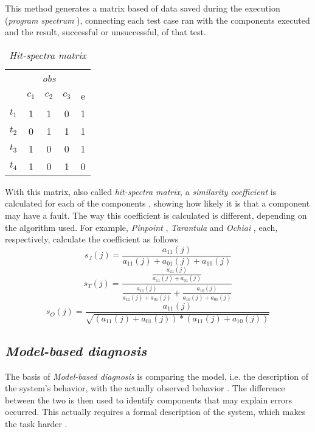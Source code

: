 This method generates a matrix based of data saved during the execution (\emph{program spectrum} \cite{Reps1997}), connecting each test case ran with the components executed and the result, successful or unsuccessful, of that test.

\begin{table}[H]
  \centering
  \begin{tabular}{c|ccc|c} 
    & \multicolumn{3}{c|}{\textit{obs}} &  \\
    & $c_1$ & $c_2$ & $c_3$ & e \\ 
    \hline
    $t_1$ & 1 & 1 & 0 & 1 \\
    $t_2$ & 0 & 1 & 1 & 1 \\
    $t_3$ & 1 & 0 & 0 & 1 \\
    $t_4$ & 1 & 0 & 1 & 0 \\
  \end{tabular}
  \caption{\emph{Hit-spectra matrix}}
  \label{tab:hit-spectra}
\end{table}

With this matrix, also called \emph{hit-spectra matrix}, a \emph{similarity coefficient} is calculated for each of the components \cite{Abreu2009}, showing how likely it is that a component may have a fault. The way this coefficient is calculated is different, depending on the algorithm used. For example, \emph{Pinpoint} \cite{Chen2002}, \emph{Tarantula} \cite{Jones2005} and \emph{Ochiai} \cite{Abreu2007}, each, respectively, calculate the coefficient as follows
%
\begin{equation}
  s_J(j) = \frac {a_{11}(j)} {a_{11}(j) + a_{01}(j) + a_{10}(j)}
\end{equation}
%
\begin{equation}
  s_T(j) = \frac  { \frac {a_{11}(j)} {a_{11}(j) + a_{01}(j)} } 
          { \frac{a_{11}(j)}{a_{11}(j) + a_{01}(j)} + \frac{a_{10}(j)}{a_{10}(j) + a_{00}(j)}}
\end{equation}
%
\begin{equation}
  s_O(j) = \frac  {a_{11}(j)} 
          {\sqrt{(a_{11}(j) + a_{01}(j)) * (a_{11}(j) + a_{10}(j))}}
\end{equation}


% 
%

\subsection{\emph{Model-based diagnosis}}

The basis of \emph{Model-based diagnosis} is comparing the model, i.e. the description of the system's behavior, with the actually observed behavior \cite{Mayer2008}. The difference between the two is then used to identify components that may explain errors occurred. This actually requires a formal description of the system,  which makes the task harder \cite{Perez2004}.

